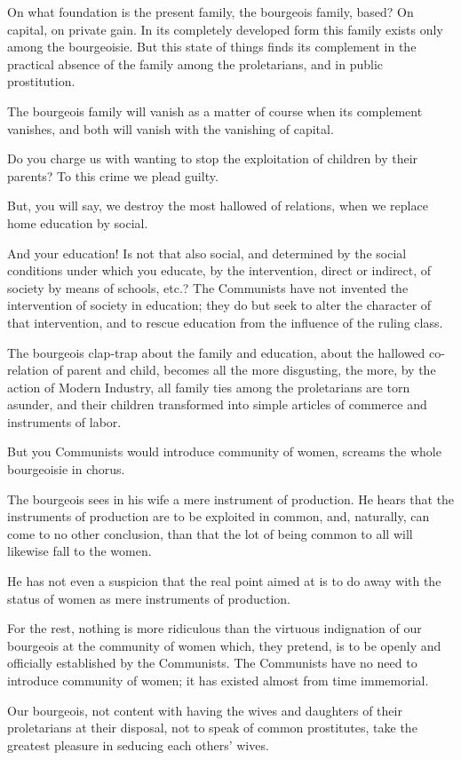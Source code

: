 On what foundation is the present family, the bourgeois family, based? On capital, on private gain. In its completely developed form this family exists only among the bourgeoisie. But this state of things finds its complement in the practical absence of the family among the proletarians, and in public prostitution.

The bourgeois family will vanish as a matter of course when its complement vanishes, and both will vanish with the vanishing of capital.

Do you charge us with wanting to stop the exploitation of children by their parents? To this crime we plead guilty.

But, you will say, we destroy the most hallowed of relations, when we replace home education by social.

And your education! Is not that also social, and determined by the social conditions under which you educate, by the intervention, direct or indirect, of society by means of schools, etc.? The Communists have not invented the intervention of society in education; they do but seek to alter the character of that intervention, and to rescue education from the influence of the ruling class.

The bourgeois clap-trap about the family and education, about the hallowed co-relation of parent and child, becomes all the more disgusting, the more, by the action of Modern Industry, all family ties among the proletarians are torn asunder, and their children transformed into simple articles of commerce and instruments of labor.

But you Communists would introduce community of women, screams the whole bourgeoisie in chorus.

The bourgeois sees in his wife a mere instrument of production. He hears that the instruments of production are to be exploited in common, and, naturally, can come to no other conclusion, than that the lot of being common to all will likewise fall to the women.

He has not even a suspicion that the real point aimed at is to do away with the status of women as mere instruments of production.

For the rest, nothing is more ridiculous than the virtuous indignation of our bourgeois at the community of women which, they pretend, is to be openly and officially established by the Communists. The Communists have no need to introduce community of women; it has existed almost from time immemorial.

Our bourgeois, not content with having the wives and daughters of their proletarians at their disposal, not to speak of common prostitutes, take the greatest pleasure in seducing each others' wives.

